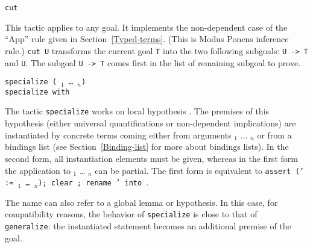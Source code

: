 \begin{coq_example*}
\begin{Variants}
\item {\tt cut {\form}}

  This tactic applies to any goal. It implements the non-dependent
  case of the ``App'' rule given in
  Section~\ref{Typed-terms}. (This is Modus Ponens inference rule.)
  {\tt cut U} transforms the current goal \texttt{T} into the two
  following subgoals: {\tt U -> T} and \texttt{U}.  The subgoal {\tt U
    -> T} comes first in the list of remaining subgoal to prove.

\item {\tt specialize ({\ident} \term$_1$ \dots\ \term$_n$)} \\
      {\tt specialize {\ident} with \bindinglist}

      The tactic {\tt specialize} works on local hypothesis \ident.
      The premises of this hypothesis (either universal
      quantifications or non-dependent implications) are instantiated
      by concrete terms coming either from arguments \term$_1$
      $\ldots$ \term$_n$ or from a bindings list (see
      Section~\ref{Binding-list} for more about bindings lists). In the
      second form, all instantiation elements must be given, whereas
      in the first form the application to \term$_1$ {\ldots}
      \term$_n$ can be partial. The first form is equivalent to
      {\tt assert (\ident' := {\ident} {\term$_1$} \dots\ \term$_n$);
           clear \ident; rename \ident' into \ident}.

      The name {\ident} can also refer to a global lemma or
      hypothesis. In this case, for compatibility reasons, the
      behavior of {\tt specialize} is close to that of {\tt
        generalize}: the instantiated statement becomes an additional
      premise of the goal.

  \begin{ErrMsgs}
  \item {}
  \item {}
  \end{ErrMsgs}



\end{Variants}
\end{coq_example*}
